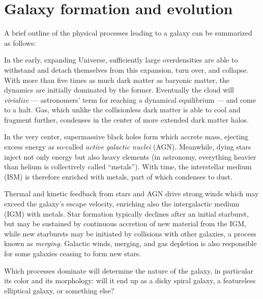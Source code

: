 \documentclass[useAMS,usenatbib,bibyear]{aa}
\begin{document}
\section{Galaxy formation and evolution}
\label{sec:galaxies}

A brief outline of the physical processes leading to a galaxy can be summarized as follows:

In the early, expanding Universe, sufficiently large overdensities are able to withstand and detach themselves from this expansion, turn over, and collapse.
With more than five times as much dark matter as baryonic matter, the dynamics are initially dominated by the former.
Eventually the cloud will \emph{virialize} --- astronomers' term for reaching a dynamical equilibrium --- and come to a halt.
Gas, which unlike the collisionless dark matter is able to cool and fragment further, condenses in the center of more extended dark matter halos.

In the very center, supermassive black holes form which accrete mass, ejecting excess energy as so-called \emph{active galactic nuclei} (AGN).
Meanwhile, dying stars inject not only energy but also heavy elements (in astronomy, everything heavier than helium is collectively called ``metals'').
With time, the interstellar medium (ISM) is therefore enriched with metals, part of which condenses to dust.

Thermal and kinetic feedback from stars and AGN drive strong winds which may exceed the galaxy's escape velocity, enriching also the intergalactic medium (IGM) with metals.
Star formation typically declines after an initial starburst, but may be sustained by continuous accretion of new material from the IGM, while new starbursts may be initiated by collisions with other galaxies, a process known as \emph{merging}.
Galactic winds, merging, and gas depletion is also responsible for some galaxies ceasing to form new stars.

Which processes dominate will determine the nature of the galaxy, in particular its color and its morphology: will it end up as a disky spiral galaxy, a featureless elliptical galaxy, or something else?
\end{document}
